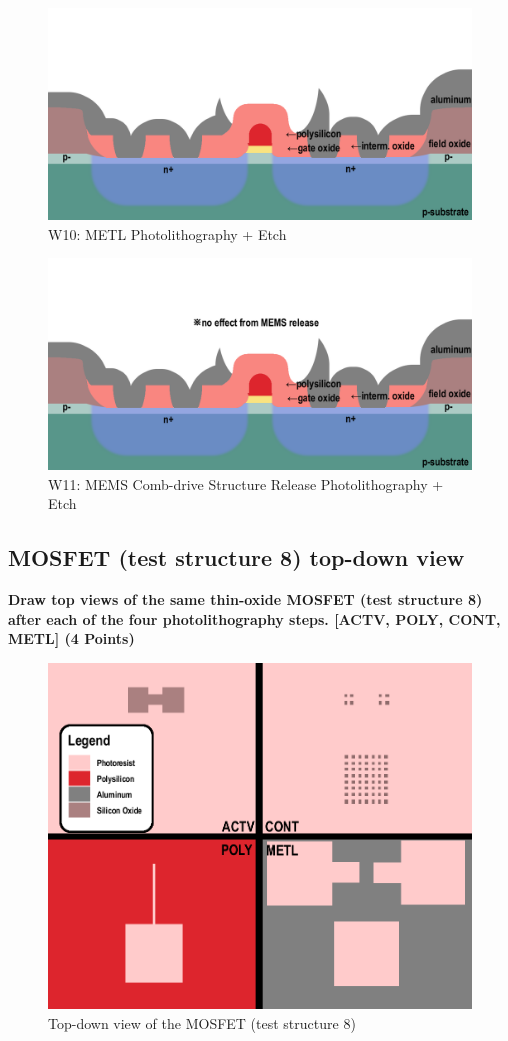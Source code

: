 \documentclass{article}
\begin{document}
\begin{figure}[H]
\centering
\includegraphics[width=350pt]{CrossSections/MOSFETlabprofiles/MOSFETw10.png}
\caption{W10: METL Photolithography + Etch}
\end{figure}
\begin{figure}[H]
\centering
\includegraphics[width=350pt]{CrossSections/MOSFETlabprofiles/MOSFETw11note.png}
\caption{W11: MEMS Comb-drive Structure Release Photolithography + Etch}
\end{figure}

\subsection{MOSFET (test structure 8) top-down view}
\textbf{Draw top views of the same thin-oxide MOSFET (test structure 8) after each of the
four photolithography steps. [ACTV, POLY, CONT, METL] (4 Points)}
\begin{figure}[H]
\centering
\includegraphics[width=350pt]{CrossSections/MOSFETlabprofiles/MOSFET_TOPDOWN.png}
\caption{Top-down view of the MOSFET (test structure 8)}
\end{figure}
\end{document}
